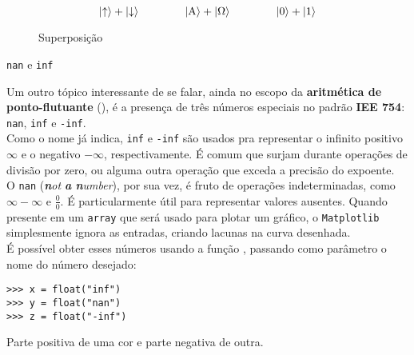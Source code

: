 \documentclass[12pt]{article}
\begin{document}
	
	\begin{figure}[H]
		\centering\Large
		$$ \left|\uparrow\right\rangle  +  \left|\downarrow\right\rangle  \hspace{40pt}  \left|\text{A}\right\rangle  +  \left|\Omega\right\rangle  \hspace{40pt}  \left|0\right\rangle  +  \left|1\right\rangle $$
	\caption{Superposição}
	\end{figure}
	
	
	
	\begin{interlude}{\texttt{nan} e \texttt{inf}}
	
	Um outro tópico interessante de se falar, ainda no escopo da \textbf{aritmética de ponto-flutuante} (), é a presença de três números especiais no padrão \textbf{IEE 754}: \texttt{nan}, \texttt{inf} e \texttt{-inf}.\\
	
	Como o nome já indica, \texttt{inf} e \texttt{-inf} são usados pra representar o infinito positivo $\infty$ e o negativo $-\infty$, respectivamente. É comum que surjam durante operações de divisão por zero, ou alguma outra operação que exceda a precisão do expoente.\\
	
	O \texttt{nan} (\textit{\textbf{n}ot \textbf{a} \textbf{n}umber}), por sua vez, é fruto de operações indeterminadas, como $\infty - \infty$ e $\frac{0}{0}$. É particularmente útil para representar valores ausentes. Quando presente em um \texttt{array} que será usado para plotar um gráfico, o \texttt{Matplotlib} simplesmente ignora as entradas, criando lacunas na curva desenhada.\\
	
	É possível obter esses números usando a função , passando como parâmetro o nome do número desejado:
	
	\begin{lstlisting}[caption='\texttt{nan} e \texttt{inf}']
>>> x = float("inf")
>>> y = float("nan")
>>> z = float("-inf")
	\end{lstlisting}
	
	\end{interlude}
	
	
	Parte positiva de uma cor e parte negativa de outra.	
	
	
	
\end{document}
